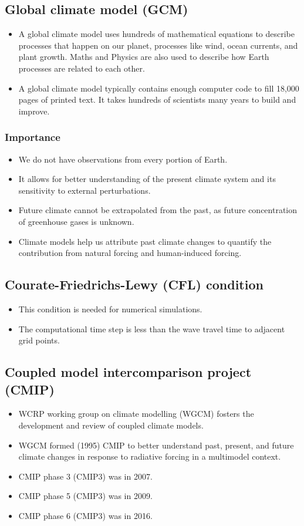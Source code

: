 \documentclass[11pt]{article}
\begin{document}
\subsection{Global climate model (GCM)}
\label{sec:org710961d}
\begin{itemize}
\item A global climate model uses hundreds of mathematical equations to describe processes that happen on our planet, processes like wind, ocean currents, and plant growth. Maths and Physics are also used to describe how Earth processes are related to each other.
\item A global climate model typically contains enough computer code to fill 18,000 pages of printed text. It takes hundreds of scientists many years to build and improve.
\end{itemize}
\subsubsection{Importance}
\label{sec:orgbfd54e7}
\begin{itemize}
\item We do not have observations from every portion of Earth.
\item It allows for better understanding of the present climate system and its sensitivity to external perturbations.
\item Future climate cannot be extrapolated from the past, as future concentration of greenhouse gases is unknown.
\item Climate models help us attribute past climate changes to quantify the contribution from natural forcing and human-induced forcing.
\end{itemize}
\subsection{Courate-Friedrichs-Lewy (CFL) condition}
\label{sec:org9e03450}
\begin{itemize}
\item This condition is needed for numerical simulations.
\item The computational time step is less than the wave travel time to adjacent grid points.
\end{itemize}
\subsection{Coupled model intercomparison project (CMIP)}
\label{sec:orgac528f9}
\begin{itemize}
\item WCRP working group on climate modelling (WGCM) fosters the development and review of coupled climate models.
\item WGCM formed (1995) CMIP to better understand past, present, and future climate changes in response to radiative forcing in a multimodel context.
\item CMIP phase 3 (CMIP3) was in 2007.
\item CMIP phase 5 (CMIP3) was in 2009.
\item CMIP phase 6 (CMIP3) was in 2016.
\end{itemize}
\end{document}
